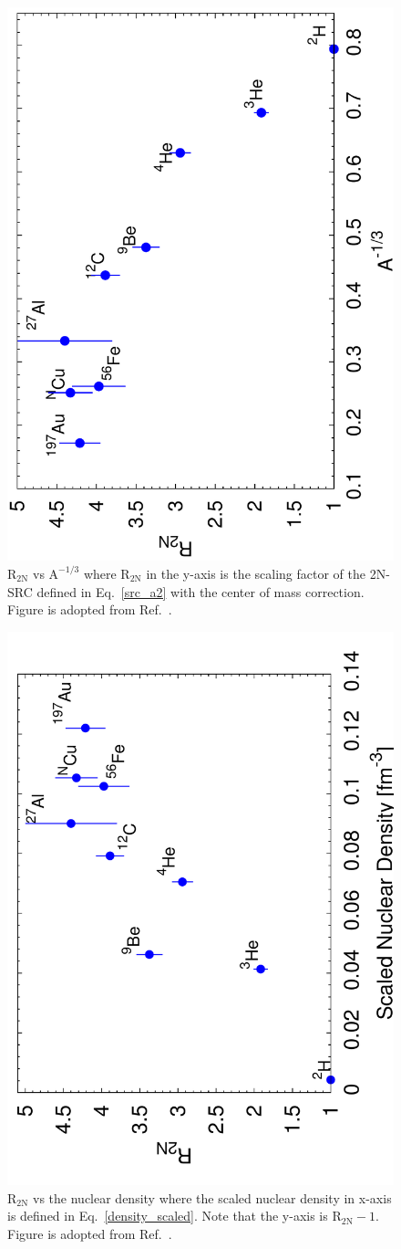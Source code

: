   \begin{figure}[!ht]
  \begin{center}
    \includegraphics[type=pdf,ext=.pdf,read=.pdf,angle=270,width=0.54\linewidth]{./figures/physics/src_vs_a_third}
    \caption[$\mathrm{R_{2N}}$ vs $\mathrm{A^{-1/3}}$]{\footnotesize{$\mathrm{R_{2N}}$ vs $\mathrm{A^{-1/3}}$ where $\mathrm{R_{2N}}$ in the y-axis is the scaling factor of the 2N-SRC defined in Eq.~\eqref{src_a2} with the center of mass correction. Figure is adopted from Ref.~\cite{john_src_emc}.}}
    \label{src_vs_a}
  \end{center}
\end{figure}  
  \begin{figure}[!ht]
  \begin{center}
    \includegraphics[type=pdf,ext=.pdf,read=.pdf,angle=270,width=0.6\linewidth]{./figures/physics/src_vs_dens_scaled}
    \caption[$\mathrm{R_{2N}}$ vs nuclear density]{\footnotesize{$\mathrm{R_{2N}}$ vs the nuclear density where the scaled nuclear density in x-axis is defined in Eq.~\eqref{density_scaled}. Note that the y-axis is $\mathrm{R_{2N}-1}$. Figure is adopted from Ref.~\cite{john_src_emc}.}}
    \label{src_vs_dens}
  \end{center}
\end{figure}    
